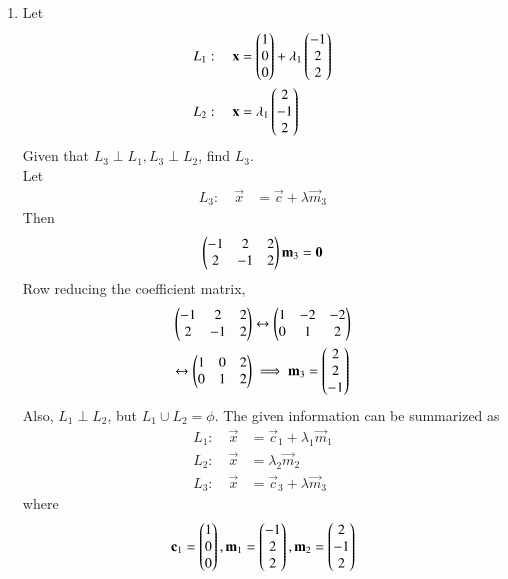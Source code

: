 \documentclass[journal,12pt,twocolumn]{IEEEtran}
\renewcommand\thesection{\arabic{section}}
\begin{document}
\begin{enumerate}[label=\thesection.\arabic*
,ref=\thesection.\theenumi]

\item Let
\begin{align}
L_1: \quad \mathbf{x} &= \begin{pmatrix}1 \\ 0 \\ 0\end{pmatrix} + \lambda_1 \begin{pmatrix}-1 \\ 2 \\ 2\end{pmatrix}
\\
L_2: \quad \mathbf{x} &=  \lambda_1 \begin{pmatrix}2 \\-1 \\ 2\end{pmatrix}
\end{align}
%
Given that  $L_3 \perp L_1, L_3 \perp L_2$, find $L_3$.
\\
\solution Let 
\begin{align}
L_3: \quad \vec{x} &= \vec{c}+ \lambda \vec{m}_3
\end{align}
% 
Then
\begin{align}
\begin{pmatrix}-1 & 2 & 2
\\
2 &-1 & 2\end{pmatrix}\mathbf{m}_3 = \mathbf{0}
\end{align}
%
Row reducing the coefficient matrix,
\begin{align}
\begin{pmatrix}-1 & 2 & 2
\\
2 &-1 & 2\end{pmatrix} &\leftrightarrow 
\begin{pmatrix}1 & -2 & -2
\\
0 &1 & 2\end{pmatrix} 
\\
\leftrightarrow 
\begin{pmatrix}1 & 0 & 2
\\
0 &1 & 2\end{pmatrix} 
& \implies \mathbf{m}_3 = \begin{pmatrix}2 \\ 2 \\ -1\end{pmatrix}
\end{align}
%
Also, $L_1\perp L_2$, but $L_1 \cup L_2 = \phi$. The given information can be summarized as
\begin{align}
\label{eq:12-given1}
L_1: \quad \vec{x} &= \vec{c}_1 + \lambda_1 \vec{m}_1
\\
L_2: \quad \vec{x} &=  \lambda_2 \vec{m}_2
\\
L_3: \quad \vec{x} &= \vec{c}_3 + \lambda \vec{m}_3
\label{eq:12-given3}
\end{align}
%
where
\begin{align}
\label{eq:12-given12}
\vec{c}_1 = \myvec{1 \\ 0 \\ 0}, \vec{m}_1=  \myvec{-1 \\ 2 \\ 2},
\vec{m}_2 = \myvec{2 \\-1 \\ 2}

\end{align}
\end{enumerate}
\end{document}
